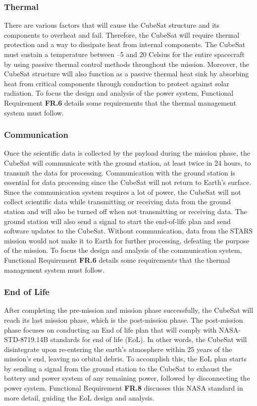 \subsubsection{Thermal}
There are various factors that will cause the CubeSat structure and its components to overheat and fail. Therefore, the CubeSat will require thermal protection and a way to dissipate heat from internal components. The CubeSat must sustain a temperature between –5 \degree and 20 \degree Celsius for the entire spacecraft by using passive thermal control methods throughout the mission. Moreover, the CubeSat structure will also function as a passive thermal heat sink by absorbing heat from critical components through conduction to protect against solar radiation.  To focus the design and analysis of the power system, Functional Requirement \textbf{FR.6} details some requirements that the thermal management system must follow. 
\subsubsection{Communication}
Once the scientific data is collected by the payload during the mission phase, the CubeSat will communicate with the ground station, at least twice in 24 hours, to transmit the data for processing. Communication with the ground station is essential for data processing since the CubeSat will not return to Earth’s surface. Since the communication system requires a lot of power, the CubeSat will not collect scientific data while transmitting or receiving data from the ground station and will also be turned off when not transmitting or receiving data. The ground station will also send a signal to start the end-of-life plan and send software updates to the CubeSat.  Without communication, data from the STARS mission would not make it to Earth for further processing, defeating the purpose of the mission. To focus the design and analysis of the communication system, Functional Requirement \textbf{FR.6} details some requirements that the thermal management system must follow. 
\subsubsection{End of Life}
After completing the pre-mission and mission phase successfully, the CubeSat will reach its last mission phase, which is the post-mission phase. The post-mission phase focuses on conducting an End of life plan that will comply with NASA-STD-8719.14B\cite{STD8719} standards for end of life (EoL). In other words, the CubeSat will disintegrate upon re-entering the earth's atmosphere within 25 years of the mission's end, leaving no orbital debris. To accomplish this, the EoL plan starts by sending a signal from the ground station to the CubeSat to exhaust the battery and power system of any remaining power, followed by disconnecting the power system. Functional Requirement \textbf{FR.8} discusses this NASA standard in more detail, guiding the EoL design and analysis. 
